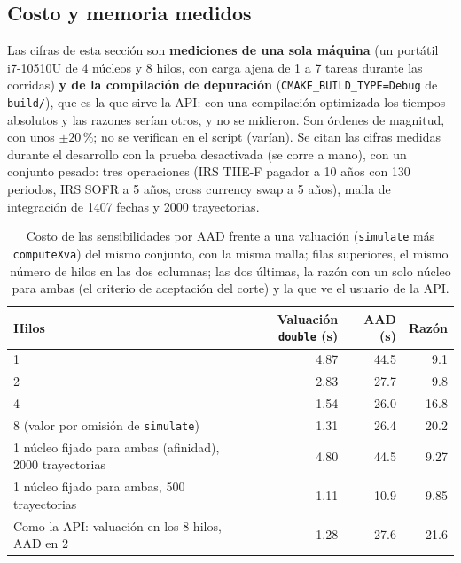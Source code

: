 \begin{sloppypar}
\subsection{Costo y memoria medidos}\label{sec:cap16-costo}

Las cifras de esta sección son \textbf{mediciones de una sola máquina} (un portátil i7-10510U de 4 núcleos y 8 hilos,
con carga ajena de 1 a 7 tareas durante las corridas) \textbf{y de la compilación de depuración} (\texttt{CMAKE\_BUILD\_TYPE=Debug}
de \texttt{build/}), que es la que sirve la API: con una compilación optimizada los tiempos absolutos y las razones serían
otros, y no se midieron. Son órdenes de magnitud, con unos $\pm20\,\%$; no se verifican en el script (varían). Se citan las cifras medidas durante el desarrollo con la prueba desactivada
 (se corre a mano), con un conjunto pesado: tres operaciones
(IRS TIIE-F pagador a 10 años con 130 periodos, IRS SOFR a 5 años, cross currency swap a 5 años), malla de integración de
1407 fechas y 2000 trayectorias.

\begin{table}[ht]
\centering\small
\begin{tabular}{@{}lrrr@{}}
\toprule
Hilos & Valuación \texttt{double} (s) & AAD (s) & Razón \\
\midrule
1 & 4.87 & 44.5 & 9.1 \\
2 & 2.83 & 27.7 & 9.8 \\
4 & 1.54 & 26.0 & 16.8 \\
8 (valor por omisión de \texttt{simulate}) & 1.31 & 26.4 & 20.2 \\
\midrule
1 núcleo fijado para ambas (afinidad), 2000 trayectorias & 4.80 & 44.5 & 9.27 \\
1 núcleo fijado para ambas, 500 trayectorias & 1.11 & 10.9 & 9.85 \\
Como la API: valuación en los 8 hilos, AAD en 2 & 1.28 & 27.6 & 21.6 \\
\bottomrule
\end{tabular}
\caption{Costo de las sensibilidades por AAD frente a una valuación (\texttt{simulate} más \texttt{computeXva}) del mismo
conjunto, con la misma malla; filas superiores, el mismo número de hilos en las dos columnas; las dos últimas, la
razón con un solo núcleo para ambas (el criterio de aceptación del corte) y la que ve el usuario de la API.}\label{tab:cap16-costo}
\end{table}


\end{sloppypar}

